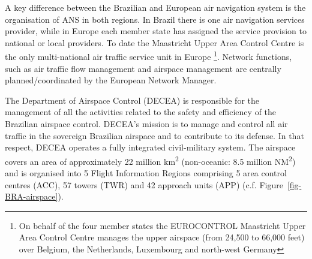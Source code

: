 \documentclass[
  a4paper,
  DIV=11,
  numbers=noendperiod]{scrreprt}
\begin{document}
A key difference between the Brazilian and European air navigation
system is the organisation of ANS in both regions. In Brazil there is
one air navigation services provider, while in Europe each member state
has assigned the service provision to national or local providers. To
date the Maastricht Upper Area Control Centre is the only multi-national
air traffic service unit in Europe \footnote{On behalf of the four
  member states the EUROCONTROL Maastricht Upper Area Control Centre
  manages the upper airspace (from 24,500 to 66,000 feet) over Belgium,
  the Netherlands, Luxembourg and north-west Germany}. Network
functions, such as air traffic flow management and airspace management
are centrally planned/coordinated by the European Network Manager.

The Department of Airspace Control (DECEA) is responsible for the
management of all the activities related to the safety and efficiency of
the Brazilian airspace control. DECEA's mission is to manage and control
all air traffic in the sovereign Brazilian airspace and to contribute to
its defense. In that respect, DECEA operates a fully integrated
civil-military system. The airspace covers an area of approximately 22
million km\textsuperscript{2} (non-oceanic: 8.5 million
NM\textsuperscript{2}) and is organised into 5 Flight Information
Regions comprising 5 area control centres (ACC), 57 towers (TWR) and 42
approach units (APP) (c.f. Figure~\ref{fig-BRA-airspace}).
\end{document}
